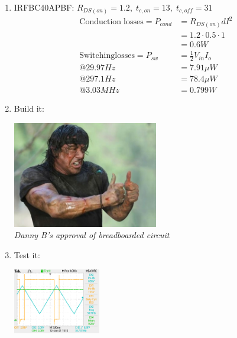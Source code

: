 \documentclass[11pt]{article}
\begin{document}
\begin{preview}
\begin{enumerate}
\begin{center}
                  \end{center}
            \item IRFBC40APBF: $R_{DS(on)}=1.2, \; t_{c,on}=13, \; t_{c,off}=31$
                  \begin{align*}
                        \mathrm{Conduction \; losses} = P_{cond} &= R_{DS(on)}dI^{2}\\
                                                                 &= 1.2{\cdot}0.5{\cdot}1\\
                                                                 &= 0.6W \\
                        \mathrm{Switching losses} = P_{sw} &= \frac{1}{2}V_{in}I_{o} \\
                                                      @29.97Hz &= 7.91\mu W \\
                                                      @297.1Hz &= 78.4\mu W \\
                                                      @3.03MHz &= 0.799W
                  \end{align*}
            \item Build it:
                  \begin{center}
                        \includegraphics[width=0.5\textwidth]{img/thumbs.png} \\
                        \textit{Danny B's approval of breadboarded circuit}
                  \end{center}
            \item Test it:
                  \begin{center}
                        \includegraphics[width=0.3\textwidth]{img/lowest_f.png}

\end{center}
\end{enumerate}
\end{preview}
\end{document}
